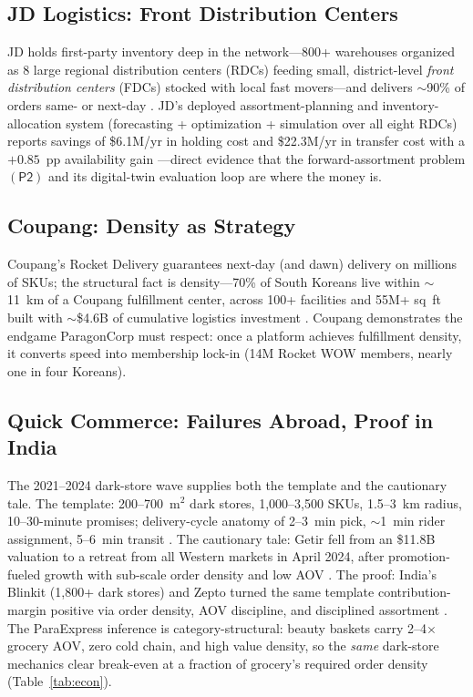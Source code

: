 \documentclass[journal]{IEEEtran}
\begin{document}
\subsection{JD Logistics: Front Distribution Centers}
JD holds first-party inventory deep in the network---800+ warehouses organized as 8 large regional distribution centers (RDCs) feeding small, district-level \emph{front distribution centers} (FDCs) stocked with local fast movers---and delivers ${\sim}$90\% of orders same- or next-day \cite{jdwarehouses}. JD's deployed assortment-planning and inventory-allocation system (forecasting + optimization + simulation over all eight RDCs) reports savings of \${}6.1M/yr in holding cost and \${}22.3M/yr in transfer cost with a $+0.85$~pp availability gain \cite{jdassort}---direct evidence that the forward-assortment problem $(\mathsf{P2})$ and its digital-twin evaluation loop are where the money is.

\subsection{Coupang: Density as Strategy}
Coupang's Rocket Delivery guarantees next-day (and dawn) delivery on millions of SKUs; the structural fact is density---70\% of South Koreans live within ${\sim}$11~km of a Coupang fulfillment center, across 100+ facilities and 55M+ sq~ft built with ${\sim}$\$4.6B of cumulative logistics investment \cite{coupang,coupanginnov}. Coupang demonstrates the endgame ParagonCorp must respect: once a platform achieves fulfillment density, it converts speed into membership lock-in (14M Rocket WOW members, nearly one in four Koreans).

\subsection{Quick Commerce: Failures Abroad, Proof in India}
The 2021--2024 dark-store wave supplies both the template and the cautionary tale. The template: 200--700~m$^2$ dark stores, 1{,}000--3{,}500 SKUs, 1.5--3~km radius, 10--30-minute promises; delivery-cycle anatomy of 2--3~min pick, ${\sim}$1~min rider assignment, 5--6~min transit \cite{qcops,blinkit}. The cautionary tale: Getir fell from an \$11.8B valuation to a retreat from all Western markets in April 2024, after promotion-fueled growth with sub-scale order density and low AOV \cite{getir,sifted}. The proof: India's Blinkit (1{,}800+ dark stores) and Zepto turned the same template contribution-margin positive via order density, AOV discipline, and disciplined assortment \cite{indiaqc,blinkit}. The ParaExpress inference is category-structural: beauty baskets carry 2--4$\times$ grocery AOV, zero cold chain, and high value density, so the \emph{same} dark-store mechanics clear break-even at a fraction of grocery's required order density (Table~\ref{tab:econ}).
\end{document}

